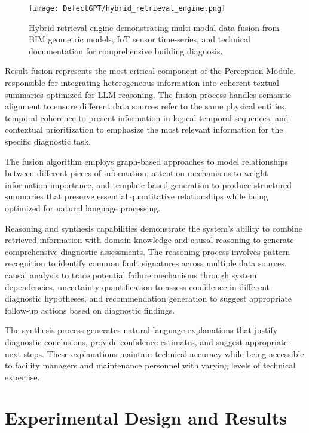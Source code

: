 \begin{figure}[htbp]
\centering
\texttt{[image: DefectGPT/hybrid\_retrieval\_engine.png]}

\caption{Hybrid retrieval engine demonstrating multi-modal data fusion from BIM geometric models, IoT sensor time-series, and technical documentation for comprehensive building diagnosis.}
\label{fig:hybrid_retrieval_engine}
\end{figure}

Result fusion represents the most critical component of the Perception Module, responsible for integrating heterogeneous information into coherent textual summaries optimized for LLM reasoning. The fusion process handles semantic alignment to ensure different data sources refer to the same physical entities, temporal coherence to present information in logical temporal sequences, and contextual prioritization to emphasize the most relevant information for the specific diagnostic task.

The fusion algorithm employs graph-based approaches to model relationships between different pieces of information, attention mechanisms to weight information importance, and template-based generation to produce structured summaries that preserve essential quantitative relationships while being optimized for natural language processing.

Reasoning and synthesis capabilities demonstrate the system's ability to combine retrieved information with domain knowledge and causal reasoning to generate comprehensive diagnostic assessments. The reasoning process involves pattern recognition to identify common fault signatures across multiple data sources, causal analysis to trace potential failure mechanisms through system dependencies, uncertainty quantification to assess confidence in different diagnostic hypotheses, and recommendation generation to suggest appropriate follow-up actions based on diagnostic findings.

The synthesis process generates natural language explanations that justify diagnostic conclusions, provide confidence estimates, and suggest appropriate next steps. These explanations maintain technical accuracy while being accessible to facility managers and maintenance personnel with varying levels of technical expertise.

\section{Experimental Design and Results}

